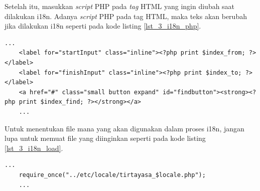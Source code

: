 Setelah itu, masukkan \textit{script} PHP pada \textit{tag} HTML yang ingin diubah saat dilakukan i18n. Adanya \textit{script} PHP pada tag HTML, maka teks akan berubah jika dilakukan i18n seperti pada kode listing \ref{lst_3_i18n_php}.

\begin{lstlisting}[caption=Script PHP untuk Internationalization,label = {lst_3_i18n_php}]
	...
	<label for="startInput" class="inline"><?php print $index_from; ?></label>
	<label for="finishInput" class="inline"><?php print $index_to; ?></label>
	<a href="#" class="small button expand" id="findbutton"><strong><?php print $index_find; ?></strong></a>
	...
\end{lstlisting}

Untuk menentukan file mana yang akan digunakan dalam proses i18n, jangan lupa untuk memuat file yang diinginkan seperti pada kode listing \ref{lst_3_i18n_load}.
\begin{lstlisting}[caption=Script PHP untuk memuat file i18n,label = {lst_3_i18n_load}]
	...
	require_once("../etc/locale/tirtayasa_$locale.php");
	...
\end{lstlisting}

